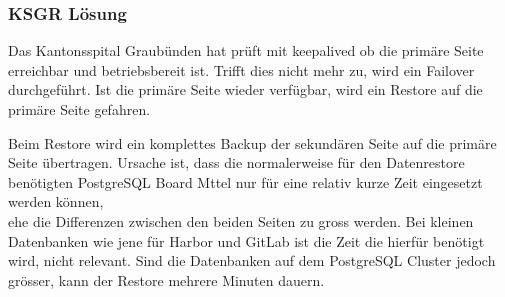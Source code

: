 
\begin{flushleft}
    \subsubsection{KSGR Lösung}
    Das Kantonsspital Graubünden hat prüft mit \gls{keepalived} ob die primäre Seite erreichbar und betriebsbereit ist.
    Trifft dies nicht mehr zu, wird ein \Gls{Failover} durchgeführt\cite{NLF2IDBZ}.
    Ist die primäre Seite wieder verfügbar, wird ein Restore auf die primäre Seite gefahren.
\end{flushleft}
\begin{flushleft}
    Beim Restore wird ein komplettes Backup der sekundären Seite auf die primäre Seite übertragen.
    Ursache ist, dass die normalerweise für den Datenrestore benötigten \Gls{PostgreSQL} Board Mttel nur für eine relativ kurze Zeit eingesetzt werden können,\\
    ehe die Differenzen zwischen den beiden Seiten zu gross werden.
    Bei kleinen Datenbanken wie jene für \Gls{Harbor} und \Gls{GitLab} ist die Zeit die hierfür benötigt wird, nicht relevant.
    Sind die Datenbanken auf dem \Gls{PostgreSQL Cluster} jedoch grösser, kann der Restore mehrere Minuten dauern.
\end{flushleft}